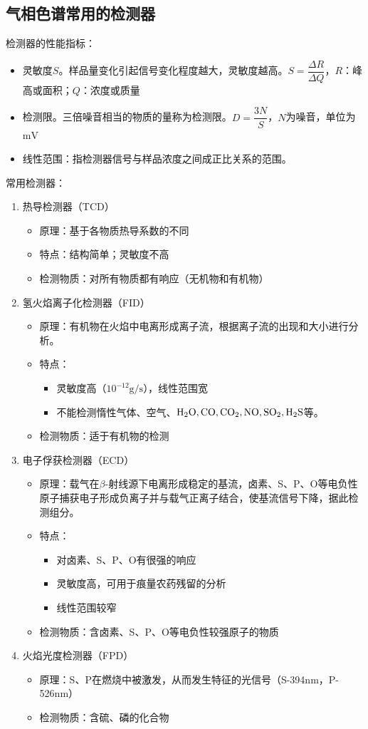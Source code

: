 \subsection{气相色谱常用的检测器}
检测器的性能指标：
\begin{itemize}
	\item 灵敏度$S$。样品量变化引起信号变化程度越大，灵敏度越高。$S=\dfrac{\Delta R}{\Delta  Q}$，$R$：峰高或面积；$Q$：浓度或质量
	\item 检测限。三倍噪音相当的物质的量称为检测限。$D=\dfrac{3N}{S}$，$N$为噪音，单位为$\mathrm{mV}$
	\item 线性范围：指检测器信号与样品浓度之间成正比关系的范围。
\end{itemize}

常用检测器：
\begin{enumerate}
	\item 热导检测器（TCD）
	\begin{itemize}
		\item 原理：基于各物质热导系数的不同
		\item 特点：结构简单；灵敏度不高
		\item 检测物质：对所有物质都有响应（无机物和有机物）
	\end{itemize}
	\item 氢火焰离子化检测器（FID）
	\begin{itemize}
		\item 原理：有机物在火焰中电离形成离子流，根据离子流的出现和大小进行分析。
		\item 特点：
		\begin{itemize}
			\item 灵敏度高（$10^{-12}\mathrm{g/s}$），线性范围宽
			\item 不能检测惰性气体、空气、$\ce{H2O,CO,CO2,NO,SO2,H2S}$等。
		\end{itemize}
		\item 检测物质：适于有机物的检测
	\end{itemize}
	\item 电子俘获检测器（ECD）
	\begin{itemize}
		\item 原理：载气在$\beta$-射线源下电离形成稳定的基流，卤素、S、P、O等电负性原子捕获电子形成负离子并与载气正离子结合，使基流信号下降，据此检测组分。
		\item 特点：
		\begin{itemize}
			\item 对卤素、S、P、O有很强的响应
			\item 灵敏度高，可用于痕量农药残留的分析
			\item 线性范围较窄
		\end{itemize}
		\item 检测物质：含卤素、S、P、O等电负性较强原子的物质
	\end{itemize}
	\item 火焰光度检测器（FPD）
	\begin{itemize}
		\item 原理：S、P在燃烧中被激发，从而发生特征的光信号（S-394nm，P-526nm）	
		\item 检测物质：含硫、磷的化合物
	\end{itemize}
\end{enumerate}

